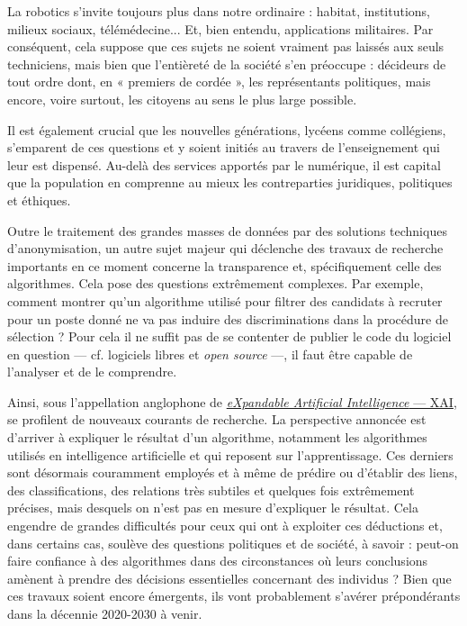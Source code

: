 La \gls{robotics} s'invite toujours plus dans notre ordinaire : habitat, institutions, milieux sociaux, télémédecine... Et, bien entendu, applications militaires. Par conséquent, cela suppose que ces sujets ne soient vraiment pas laissés aux seuls techniciens, mais bien que l'entièreté de la société s'en préoccupe : décideurs de tout ordre dont, en « premiers de cordée », les représentants politiques, mais encore, voire surtout, les citoyens au sens le plus large possible.

Il est également crucial que les nouvelles générations, lycéens com\-me collégiens, s'emparent de ces questions et y soient initiés au travers de l'enseignement qui leur est dispensé. Au-delà des services apportés par le numérique, il est capital que la population en comprenne au mieux les contreparties juridiques, politiques et éthiques. 

Outre le traitement des grandes masses de données par des solutions techniques d'anonymisation, un autre sujet majeur qui déclenche des travaux de recherche importants en ce moment concerne la transparence et, spécifiquement celle des algorithmes. Cela pose des questions extrêmement complexes. Par exemple, comment montrer qu'un algorithme utilisé pour filtrer des candidats à recruter pour un poste donné ne va pas induire des discriminations dans la procédure de sélection ? Pour cela il ne suffit pas de se contenter de publier le code du logiciel en question --- cf. logiciels libres et \textit{open source} ---, il faut être capable de l'analyser et de le comprendre.

Ainsi, sous l'appellation anglophone de \href{https://en.wikipedia.org/wiki/Explainable_artificial_intelligence}{\textit{eXpandable Artificial Intelligence} --- XAI}, se profilent de nouveaux courants de recherche. 
La perspective annoncée est d'arriver à expliquer le résultat d'un algorithme, notamment les algorithmes utilisés en intelligence artificielle et qui reposent sur l'apprentissage. Ces derniers sont désormais couramment employés et à même de prédire ou d'établir des liens, des classifications, des relations très subtiles et quelques fois extrêmement précises, mais desquels on n'est pas en mesure d'expliquer le résultat.
Cela engendre de grandes difficultés pour ceux qui ont à exploiter ces déductions et, dans certains cas, soulève des questions politiques et de société, à savoir : peut-on faire confiance à des algorithmes dans des circonstances où leurs conclusions amènent à prendre des décisions essentielles concernant des individus ? Bien que ces travaux soient encore émergents, ils vont probablement s'avérer prépondérants dans la décennie 2020-2030 à venir.

